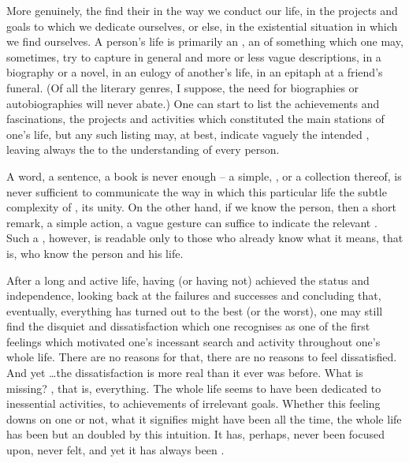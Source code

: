 {More genuinely, the  find their  in the
way we conduct our life, in the projects and goals to which we
dedicate ourselves, or else, in the existential situation in which we find 
ourselves.  A person's life
is primarily an , an  of something which
one may, sometimes, try to capture in general and more or less vague
descriptions, in a biography or a novel, in an eulogy of another's
life, in an epitaph at a friend's funeral. 
(Of all the literary genres, I suppose, the need for biographies or 
autobiographies will never abate.) 
One can start to list the
achievements and fascinations, the projects and activities which
constituted the main stations of one's life, but any such listing may,
at best, indicate vaguely the intended , leaving always
the  to the understanding of every person.

A word, a sentence, a book is never enough -- a simple, 
, or a collection thereof, is never sufficient to communicate
the way in which this particular life  the subtle
complexity of  , its unity.  On the other
hand, if we know the person, then a short remark, a simple action, a
vague gesture can suffice to indicate the relevant .  Such
a , however, is readable only to those who already know what
it means, that is, who know the person and his life.

\subpa After a long and active life, having (or having not) achieved
the status and independence, looking back at the failures and
successes and concluding that, eventually, everything has turned out
to the best (or the worst), one may still find the disquiet and
dissatisfaction which one recognises as one of the first feelings
which motivated one's incessant search and activity throughout one's
whole life.  There are no reasons for that, there are no 
reasons to feel dissatisfied.  And yet \ldots the dissatisfaction is
more real than it ever was before.  What is missing?  ,
that is, everything.  The whole life seems to have been dedicated to
inessential activities, to achievements of irrelevant goals.  Whether
this feeling downs on one or not, what it signifies might have been
 all the time, the whole life has been but an
 doubled by this  intuition.  It has,
perhaps, never been  focused upon, never 
felt, and yet it has always been .

} %


